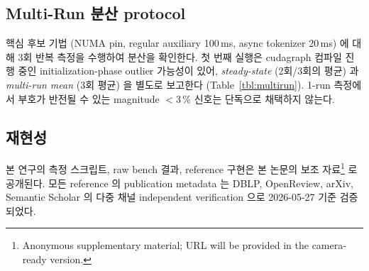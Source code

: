 \subsection{Multi-Run 분산 protocol}
\label{subsec:multirun}

핵심 후보 기법 (NUMA pin, regular auxiliary 100\,ms, async tokenizer 20\,ms) 에 대해 3회 반복 측정을 수행하여 분산을 확인한다.
첫 번째 실행은 cudagraph 컴파일 진행 중인 initialization-phase outlier 가능성이 있어, \emph{steady-state} (2회/3회의 평균) 과 \emph{multi-run mean} (3회 평균) 을 별도로 보고한다 (Table~\ref{tbl:multirun}).
1-run 측정에서 부호가 반전될 수 있는 magnitude $< 3\,\%$ 신호는 단독으로 채택하지 않는다.

\subsection{재현성}

본 연구의 측정 스크립트, raw bench 결과, \algname reference 구현은 본 논문의 보조 자료\footnote{Anonymous supplementary material; URL will be provided in the camera-ready version.} 로 공개된다.
모든 reference 의 publication metadata 는 DBLP, OpenReview, arXiv, Semantic Scholar 의 다중 채널 independent verification 으로 2026-05-27 기준 검증되었다.
